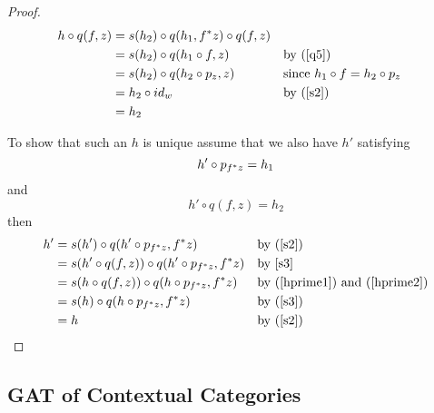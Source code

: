\documentclass[10pt,a4paper]{scrartcl}
\begin{document}
\begin{proof}
\begin{align*}
h \circ q(f,z)
                 & = s(h_2) \circ q(h_1,f ^* z) \circ q(f,z) &\\
                 & = s(h_2) \circ q(h_1 \circ f,z)   &&\mbox{by (\ref{q5})}\\
								 & = s(h_2) \circ q(h_2 \circ p_z ,z)&&\mbox{since }h_1 \circ f = h_2 \circ p_z \\
                 & = h_2  \circ id_w                 &&\mbox{by (\ref{s2})} \\
								 & = h_2
\end{align*}

\noindent 
To show that such an $h$ is unique assume that we also have $h'$ satisfying
\begin{equation}
\label{hprime1}
h' \circ p_{f ^* z} = h_1
\end{equation}
and
\begin{equation}
\label{hprime2}
h' \circ q(f,z) = h_2
\end{equation}
\noindent then
\begin{align*}
h'
        & = s(h')              \circ q(h' \circ p_{f ^* z},f ^* z) &&\mbox{by (\ref{s2})}\\
			  & = s(h' \circ q(f,z)) \circ q(h' \circ p_{f ^* z},f ^* z)&&\mbox{by \ref{s3} }\\
        & = s(h  \circ q(f,z)) \circ q(h \circ p_{f ^* z},f ^* z) &&\mbox{by (\ref{hprime1}) and (\ref{hprime2})} \\
				& = s(h)               \circ q(h \circ p_{f ^* z},f ^* z) &&\mbox{by (\ref{s3})}\\
				& = h                                                         &&\mbox{by (\ref{s2})}
\end{align*}
\end{proof}

\subsection{GAT of Contextual Categories}
\end{document}
